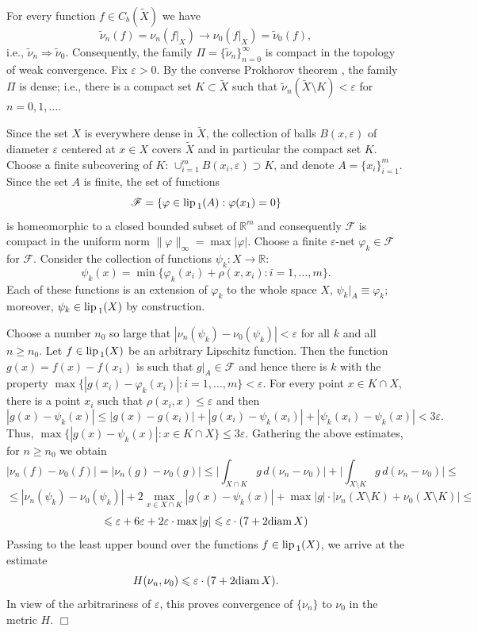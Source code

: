 \documentclass[11pt,a4paper]{article}
\begin{document}
For every function $f\in C_b(\tilde{X})$ we have
$$\tilde{\nu}_n(f)=\nu_n(f|_X)\to\nu_0(f|_X)=\tilde{\nu}_0(f),$$
i.e., $\tilde{\nu}_n\Rightarrow\tilde{\nu}_0$.
Consequently, the family $\Pi=\{\tilde{\nu}_n\}_{n=0}^{\infty}$
is compact in the topology of weak convergence.
Fix $\varepsilon>0$.
By the converse Prokhorov theorem \cite[Chapter 1, \S 6, Theorem 6.2]{Bl},
the family $\Pi$ is dense; i.e.,
there is a compact set $K\subset \tilde{X}$ such that
$\tilde{\nu}_n(\tilde{X}\setminus K)<\varepsilon$ for $n=0,1,\ldots$.

Since the set $X$ is everywhere dense in $\tilde{X}$,
the collection of balls $B(x,\varepsilon)$
of diameter $\varepsilon$ centered at $x\in X$
covers $\tilde{X}$ and in particular the compact set $K$.
Choose a finite subcovering of $K$:
$\cup_{i=1}^{m} B(x_i,\varepsilon)\supset K$, and denote
$A=\{x_i\}_{i=1}^{m}$.
Since the set $A$ is finite, the set of functions
$$\mathcal{F}=\{\varphi\in{\rm lip\,}_1(A): \varphi(x_1)=0 \}$$
is homeomorphic to a closed bounded subset of $\mathbb{R}^m$
and consequently $\mathcal{F}$ is compact in the uniform norm
$\|\varphi\|_{\infty}=\max|\varphi|.$
Choose a finite $\varepsilon$-net
$\varphi_k\in\mathcal{F}$ for $\mathcal{F}$.
Consider the collection of functions $\psi_k:X\to\mathbb{R}$:
$$\psi_k(x)=\min\{\varphi_k(x_i)+\rho(x,x_i): i=1,\ldots,m\}.$$
Each of these functions is an extension of $\varphi_k$
to the whole space $X$,
${\psi_k|_A\equiv\varphi_k}$;
moreover, $\psi_k\in{\rm lip\,}_1(X)$ by construction.

Choose a number $n_0$ so large that
$|\nu_n(\psi_k)-\nu_0(\psi_k)|<\varepsilon$
for all $k$ and all $n\ge n_0$.
Let $f\in{\rm lip\,}_1(X)$ be an arbitrary Lipschitz function.
Then the function $g(x)=f(x)-f(x_1)$ is such that $g|_A\in\mathcal{F}$
and hence there is $k$ with the property
$\max\{|g(x_i)-\varphi_k(x_i)|: i=1,\ldots,m\}<\varepsilon$.
For every point $x\in K\cap X$, there is a point $x_i$ such that
$\rho(x_i,x)\le\varepsilon$ and then
$$|g(x)-\psi_k(x)|\le|g(x)-g(x_i)|+|g(x_i)-\psi_k(x_i)|+|\psi_k(x_i)-\psi_k(x)|<3\varepsilon.$$
Thus,
$\max\{|g(x)-\psi_k(x)|: x\in K\cap X\}\le 3\varepsilon$.
Gathering the above estimates, for $n\ge n_0$ we obtain
$$|\nu_n(f)-\nu_0(f)|=|\nu_n(g)-\nu_0(g)|\le
  \biggl|\int_{X\cap K} g\,d(\nu_n-\nu_0)\biggr|+\biggl|\int_{X\setminus K} g\,d(\nu_n-\nu_0)\biggr|\le$$
$$\le|\nu_n(\psi_k)-\nu_0(\psi_k)| + %
  2\max_{x\in X\cap K}|g(x)-\psi_k(x)| +
  \max|g|\cdot|\nu_n(X\setminus K)+\nu_0(X\setminus K)|\le$$
$$\leqslant\varepsilon + 6\varepsilon + 2\varepsilon\cdot\max|g| \leqslant
  \varepsilon\cdot(7+2{\rm diam\,} X)$$
Passing to the least upper bound over the functions $f\in{\rm lip\,}_1(X)$, we arrive at the estimate
$$H(\nu_n,\nu_0)\leqslant \varepsilon\cdot(7+2{\rm diam\,} X).$$
In view of the arbitrariness of $\varepsilon$,
this proves convergence of $\{\nu_n\}$ to $\nu_0$ in the metric $H$.
\hbox{$\Box$} %
\end{document}
